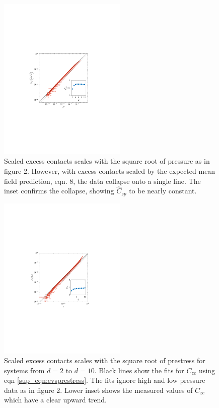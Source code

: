   
\begin{figure}[h!]
    \includegraphics[width=230px, trim=133 242 168 254, clip]{excessContactsScaling/evspcomp.pdf}
    \caption{Scaled excess contacts scales with the square root of pressure as in figure 2.
    However, with excess contacts scaled by the expected mean field prediction, eqn. 8,
    the data collapse onto a single line. The inset confirms the collapse, showing $\hat{C}_{zp}$ to be nearly constant.}
     \label{plot:evspcomp}
\end{figure}
\begin{figure}[h!]
    \includegraphics[width=230px, trim=143 240 163 250, clip]{excessContactsScaling/prestressvse.pdf}
    \caption{Scaled excess contacts scales with the square root of prestress for systems from $d=2$ to $d=10$. Black lines show the fits for $C_{ze}$ using eqn \ref{sup_eqn:evsprestress}. The fits ignore high and low pressure data as in figure 2.
    Lower inset shows the measured values of $C_{ze}$ which have a clear upward trend.}
    \label{plot:evsprestress}
\end{figure}

